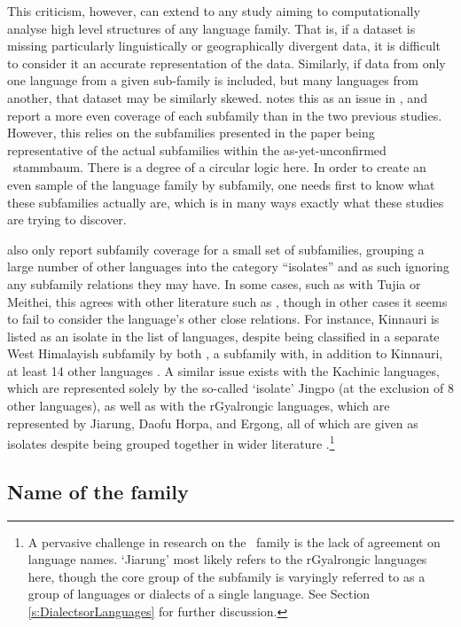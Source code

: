 This criticism, however, can extend to any study aiming to computationally analyse high level structures of any language family. That is, if a dataset is missing particularly linguistically or geographically divergent data, it is difficult to consider it an accurate representation of the data. Similarly, if data from only one language from a given sub-family is included, but many languages from another, that dataset may be similarly skewed.  notes this as an issue in , and report a more even coverage of each subfamily than in the two previous studies. However, this relies on the subfamilies presented in the paper being representative of the actual subfamilies within the as-yet-unconfirmed \lfam\ stammbaum. There is a degree of a circular logic here. In order to create an even sample of the language family by subfamily, one needs first to know what these subfamilies actually are, which is in many ways exactly what these studies are trying to discover.

 also only report subfamily coverage for a small set of subfamilies, grouping a large number of other languages into the category ``isolates'' and as such ignoring any subfamily relations they may have. In some cases, such as with Tujia or Meithei, this agrees with other literature such as , though in other cases it seems to fail to consider the language's other close relations. For instance, Kinnauri is listed as an isolate in the list of languages, despite being classified in a separate West Himalayish subfamily by both , a subfamily with, in addition to Kinnauri, at least 14 other languages \cite{glottolog}. A similar issue exists with the Kachinic languages, which are represented solely by the so-called `isolate' Jingpo (at the exclusion of 8 other languages), as well as with the rGyalrongic languages, which are represented by Jiarung, Daofu Horpa, and Ergong, all of which are given as isolates despite being grouped together in wider literature \cites{Honkasalo2019}{Gates2021}.\footnote{A pervasive challenge in research on the \lfam\ family is the lack of agreement on language names. `Jiarung' most likely refers to the rGyalrongic languages here, though the core group of the subfamily is varyingly referred to as a group of languages or dialects of a single language. See Section \ref{s:DialectsorLanguages} for further discussion.}

\subsection{Name of the family}\label{ss:THOverview:Name}

